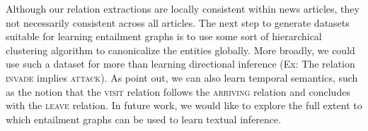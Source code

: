 Although our relation extractions are locally consistent within
news articles, they not necessarily consistent across all articles.
The next step to generate datasets suitable for learning entailment
graphs is to use some sort of hierarchical clustering
algorithm to canonicalize the entities globally. More broadly,
we could use such a dataset for more than learning directional
inference (Ex: The relation \textsc{invade} implies \textsc{attack}). 
As \citet{lewis2014semantics} point out, we can also learn temporal
semantics, such as the notion that the \textsc{visit} relation follows the  
\textsc{arriving} relation and concludes with the \textsc{leave} relation.
In future work, we would like to explore the full extent to which 
entailment graphs can be used to learn textual inference.
